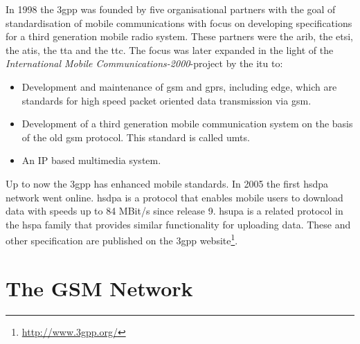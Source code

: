 In 1998 the \gls{3gpp} was founded by five organisational partners with the goal of standardisation of mobile communications with focus on developing specifications for a third generation mobile radio system.
These partners were the \gls{arib}, the \gls{etsi}, the \gls{atis}, the \gls{tta} and the \gls{ttc}.
The focus was later expanded in the light of the \emph{International Mobile Communications-2000}-project \cite{3gpp_Proposal2000} by the \gls{itu} to:
\begin{itemize}
	\item Development and maintenance of \gls{gsm} and \gls{gprs}, including \gls{edge}, which are standards for high speed packet oriented data transmission via \gls{gsm}.
	\item Development of a third generation mobile communication system on the basis of the old \gls{gsm} protocol. This standard is called \gls{umts}.
	\item An IP based multimedia system.
\end{itemize}
Up to now the \gls{3gpp} has enhanced mobile standards.
In 2005 the first \gls{hsdpa} network went online.
\gls{hsdpa} \cite{hsdpa} is a protocol that enables mobile users to download data with speeds up to 84 MBit/s since release 9.
\gls{hsupa} \cite{hsupa} is a related protocol in the \gls{hspa} family that provides similar functionality for uploading data.
These and other specification are published on the \gls{3gpp} website\footnote{\url{http://www.3gpp.org/}}.

\section{The GSM Network}
\label{sec:network}

